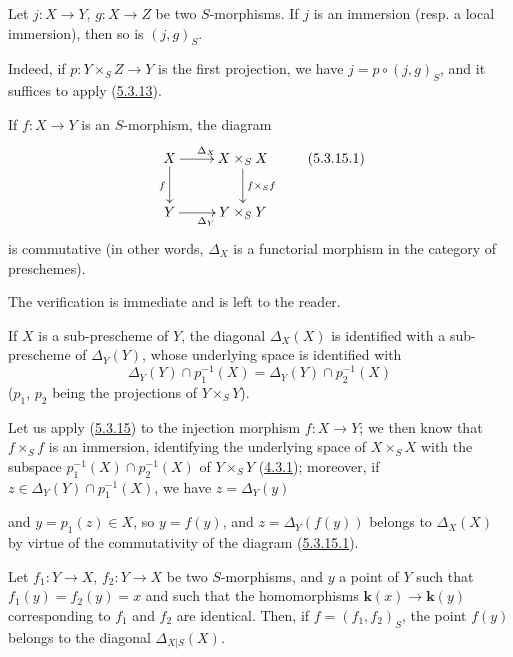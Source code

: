 \begin{corollary}[5.3.14]
\label{I.5.3.14}
Let $j:X\to Y$, $g:X\to Z$ be two $S$-morphisms. If $j$ is an immersion
(\textup{resp.} a local immersion), then so is $(j,g)_S$.
\end{corollary}

Indeed, if $p:Y\times_S Z\to Y$ is the first projection, we have
$j=p\circ(j,g)_S$, and it suffices to apply
(\hyperref[I.5.3.13]{5.3.13}).

\begin{proposition}[5.3.15]
\label{I.5.3.15}
If $f:X\to Y$ is an $S$-morphism, the diagram
\[
  \xymatrix{
    X\ar[r]^{\Delta_X}\ar[d]_f &
    X\times_S X\ar[d]^{f\times_S f}\\
    Y\ar[r]_{\Delta_Y} &
    Y\times_S Y
  }
  \tag{5.3.15.1}\label{I.5.3.15.1}
\]
is commutative \textup{(in other words, $\Delta_X$ is a functorial morphism
in the category of preschemes)}.
\end{proposition}

The verification is immediate and is left to the reader.

\begin{corollary}[5.3.16]
\label{I.5.3.16}
If $X$ is a sub-prescheme of $Y$, the diagonal $\Delta_X(X)$ is identified with
a sub-prescheme of $\Delta_Y(Y)$, whose underlying space is identified with
\[
  \Delta_Y(Y)\cap p_1^{-1}(X)=\Delta_Y(Y)\cap p_2^{-1}(X)
\]
($p_1$, $p_2$ being the projections of $Y\times_S Y$).
\end{corollary}

Let us apply (\hyperref[I.5.3.15]{5.3.15}) to the injection morphism
$f:X\to Y$; we then know that $f\times_S f$ is an immersion, identifying
the underlying space of $X\times_S X$ with the subspace
$p_1^{-1}(X)\cap p_2^{-1}(X)$ of $Y\times_S Y$
(\hyperref[I.4.3.1]{4.3.1}); moreover, if
$z\in\Delta_Y(Y)\cap p_1^{-1}(X)$, we have $z=\Delta_Y(y)$

and $y=p_1(z)\in X$, so $y=f(y)$, and $z=\Delta_Y(f(y))$ belongs to
$\Delta_X(X)$ by virtue of the commutativity of the diagram
(\hyperref[I.5.3.15.1]{5.3.15.1}).

\begin{corollary}[5.3.17]
\label{I.5.3.17}
Let $f_1:Y\to X$, $f_2:Y\to X$ be two $S$-morphisms, and $y$ a point of $Y$
such that $f_1(y)=f_2(y)=x$ and such that the homomorphisms $\boldsymbol{k}(x)\to\boldsymbol{k}(y)$
corresponding to $f_1$ and $f_2$ are identical. Then, if
$f=(f_1,f_2)_S$, the point $f(y)$ belongs to the diagonal
$\Delta_{X|S}(X)$.
\end{corollary}

